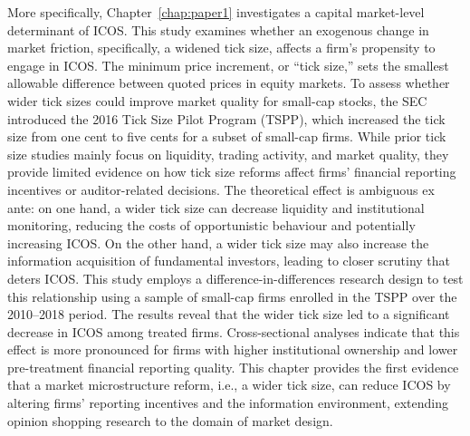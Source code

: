 \documentclass[12pt, a4paper]{report}
\begin{document}
More specifically, Chapter~\ref{chap:paper1} investigates a capital market-level determinant of ICOS. This study examines whether an exogenous change in market friction, specifically, a widened tick size, affects a firm’s propensity to engage in ICOS. The minimum price increment, or ``tick size,'' sets the smallest allowable difference between quoted prices in equity markets. To assess whether wider tick sizes could improve market quality for small-cap stocks, the SEC introduced the 2016 Tick Size Pilot Program (TSPP), which increased the tick size from one cent to five cents for a subset of small-cap firms. While prior tick size studies mainly focus on liquidity, trading activity, and market quality, they provide limited evidence on how tick size reforms affect firms’ financial reporting incentives or auditor-related decisions. The theoretical effect is ambiguous ex ante: on one hand, a wider tick size can decrease liquidity and institutional monitoring, reducing the costs of opportunistic behaviour and potentially increasing ICOS. On the other hand, a wider tick size may also increase the information acquisition of fundamental investors, leading to closer scrutiny that deters ICOS. This study employs a difference-in-differences research design to test this relationship using a sample of small-cap firms enrolled in the TSPP over the 2010--2018 period. The results reveal that the wider tick size led to a significant decrease in ICOS among treated firms. Cross-sectional analyses indicate that this effect is more pronounced for firms with higher institutional ownership\label{viva:c1-io} and lower pre-treatment financial reporting quality. This chapter provides the first evidence that a market microstructure reform, i.e., a wider tick size, can reduce ICOS by altering firms’ reporting incentives and the information environment, extending opinion shopping research to the domain of market design.
\end{document}
